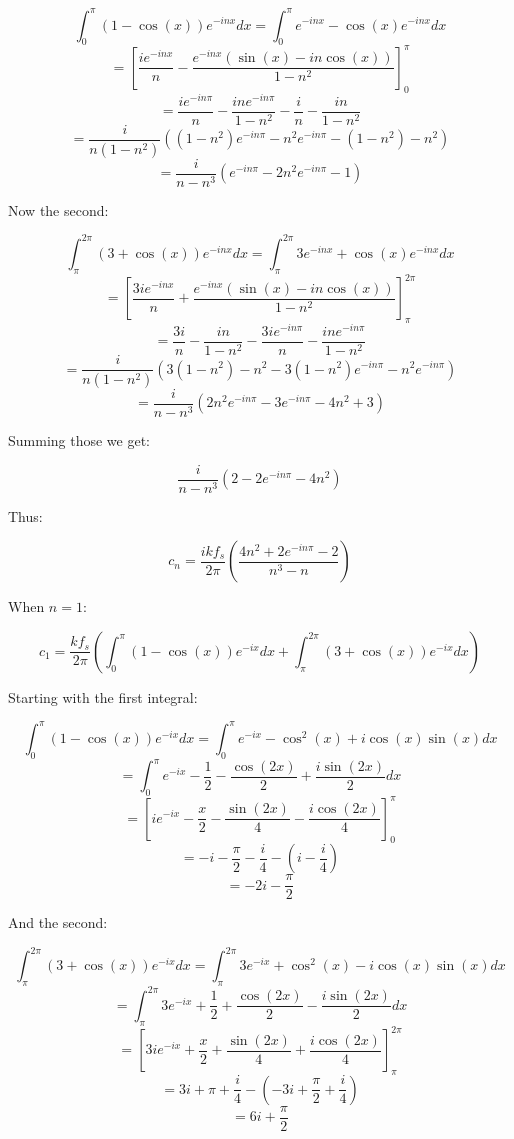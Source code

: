 \documentclass[a4paper]{article}
\begin{document}
	\[ \int_{0}^{\pi} (1-\cos(x))e^{-inx} dx = \int_{0}^{\pi} e^{-inx} - \cos(x)e^{-inx} dx \]
	\[ = \left[ \frac{ie^{-inx}}{n} - \frac{e^{-inx}(\sin(x) - in\cos(x))}{1 - n^{2}} \right]_{0}^{\pi} \]
	\[ = \frac{ie^{-in\pi}}{n} - \frac{ine^{-in\pi}}{1 - n^{2}}  - \frac{i}{n} - \frac{in}{1 - n^{2}} \]
	\[ = \frac{i}{n(1-n^{2})} \left( (1 - n^{2})e^{-in\pi} - n^{2}e^{-in\pi} - (1 - n^{2}) - n^2 \right) \]
	\[ = \frac{i}{n - n^{3}} \left( e^{-in\pi} - 2n^{2}e^{-in\pi} - 1 \right) \]

	Now the second:

	\[ \int_{\pi}^{2\pi} (3+\cos(x))e^{-inx} dx = \int_{\pi}^{2\pi} 3e^{-inx} + \cos(x)e^{-inx} dx \]
	\[ = \left[ \frac{3ie^{-inx}}{n} + \frac{e^{-inx}(\sin(x) - in\cos(x))}{1 - n^{2}} \right]_{\pi}^{2\pi} \]
	\[ = \frac{3i}{n} - \frac{in}{1 - n^{2}} - \frac{3ie^{-in\pi}}{n} - \frac{ine^{-in\pi}}{1 - n^{2}} \]
	\[ = \frac{i}{n(1-n^{2})} \left( 3(1-n^{2}) - n^{2} - 3(1-n^{2})e^{-in\pi} - n^{2}e^{-in\pi} \right) \]
	\[ = \frac{i}{n - n^{3}} \left( 2n^{2}e^{-in\pi} - 3e^{-in\pi} - 4n^{2} + 3 \right) \]

	Summing those we get:

	\[ \frac{i}{n - n^{3}} \left( 2 - 2e^{-in\pi} - 4n^{2} \right) \]

	Thus:

	\[ \boxed{c_{n} = \frac{ikf_{s}}{2\pi} \left( \frac{4n^{2} + 2e^{-in\pi} - 2}{n^{3} - n} \right)} \]

	When $n = 1$:

	\[ c_{1} = \frac{kf_{s}}{2\pi} \left( \int_{0}^{\pi} (1-\cos(x))e^{-ix} dx
				              + \int_{\pi}^{2\pi} (3 + \cos(x))e^{-ix} dx 
			                      \right) \]

	Starting with the first integral:
	
	\[ \int_{0}^{\pi} (1-\cos(x))e^{-ix} dx = \int_{0}^{\pi} e^{-ix} - \cos^{2}(x) + i\cos(x)\sin(x) dx \]
	\[ = \int_{0}^{\pi} e^{-ix} - \frac{1}{2} - \frac{\cos(2x)}{2} + \frac{i\sin(2x)}{2} dx \]
	\[ = \left[ ie^{-ix} - \frac{x}{2} - \frac{\sin(2x)}{4} - \frac{i\cos(2x)}{4} \right]_{0}^{\pi} \]
	\[ = -i - \frac{\pi}{2} - \frac{i}{4} - \left( i - \frac{i}{4} \right) \]
	\[ = -2i - \frac{\pi}{2} \]

	And the second:
	
	\[ \int_{\pi}^{2\pi} (3+\cos(x))e^{-ix} dx = \int_{\pi}^{2\pi} 3e^{-ix} + \cos^{2}(x) - i\cos(x)\sin(x) dx \]
	\[ = \int_{\pi}^{2\pi} 3e^{-ix} + \frac{1}{2} + \frac{\cos(2x)}{2} - \frac{i\sin(2x)}{2} dx \]
	\[ = \left[ 3ie^{-ix} + \frac{x}{2} + \frac{\sin(2x)}{4} + \frac{i\cos(2x)}{4} \right]_{\pi}^{2\pi} \]
	\[ = 3i + \pi + \frac{i}{4} - \left( -3i + \frac{\pi}{2} + \frac{i}{4} \right) \]
	\[ = 6i + \frac{\pi}{2} \]
\end{document}
